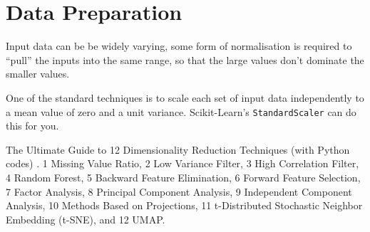 
\chapter{Data Preparation}
\label{sec:DataPreparation}


Input data can be be widely varying, some form of normalisation is required to ``pull'' the inputs into the same range, so that the large values don't dominate the smaller values.  

One of the standard techniques is to scale each set of input data independently to a mean value of zero and a unit variance.
Scikit-Learn's \lstinline{StandardScaler} can do this for you.


The Ultimate Guide to 12 Dimensionality Reduction Techniques (with Python codes) \cite{PulkitSharma2018}.
1 Missing Value Ratio,
2 Low Variance Filter,
3 High Correlation Filter,
4 Random Forest,
5 Backward Feature Elimination,
6 Forward Feature Selection,
7 Factor Analysis,
8 Principal Component Analysis,
9 Independent Component Analysis,
10 Methods Based on Projections,
11 t-Distributed Stochastic Neighbor Embedding (t-SNE), and 
12 UMAP.